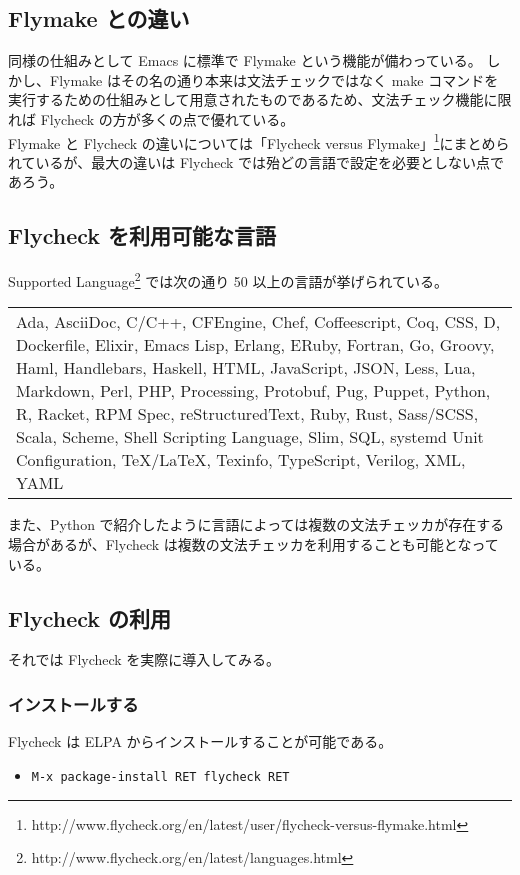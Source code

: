 \subsection{Flymake との違い}
同様の仕組みとして Emacs に標準で Flymake という機能が備わっている。
しかし、Flymake はその名の通り本来は文法チェックではなく make コマンドを実行するための仕組みとして用意されたものであるため、文法チェック機能に限れば Flycheck の方が多くの点で優れている。\\

Flymake と Flycheck の違いについては「Flycheck versus Flymake」\footnote{http://www.flycheck.org/en/latest/user/flycheck-versus-flymake.html}にまとめられているが、最大の違いは Flycheck では殆どの言語で設定を必要としない点であろう。
\subsection{Flycheck を利用可能な言語}
Supported Language\footnote{http://www.flycheck.org/en/latest/languages.html} では次の通り 50 以上の言語が挙げられている。
\begin{longtable}{@{}p{}@{}}
  Ada, AsciiDoc, C/C++, CFEngine, Chef, Coffeescript, Coq, CSS, D, Dockerfile, Elixir, Emacs Lisp, Erlang, ERuby, Fortran, Go, Groovy, Haml, Handlebars, Haskell, HTML, JavaScript, JSON, Less, Lua, Markdown, Perl, PHP, Processing, Protobuf, Pug, Puppet, Python, R, Racket, RPM Spec, reStructuredText, Ruby, Rust, Sass/SCSS, Scala, Scheme, Shell Scripting Language, Slim, SQL, systemd Unit Configuration, TeX/LaTeX, Texinfo, TypeScript, Verilog, XML, YAML
\end{longtable}
また、Python で紹介したように言語によっては複数の文法チェッカが存在する場合があるが、Flycheck は複数の文法チェッカを利用することも可能となっている。\enlargethispage{0.20zw}
\subsection{Flycheck の利用}
それでは Flycheck を実際に導入してみる。
\subsubsection{インストールする}
Flycheck は ELPA からインストールすることが可能である。
\begin{itemize}\setlength{\leftskip}{-1.00zw}%
\item[] \texttt{M-x package-install RET flycheck RET}
\end{itemize}
